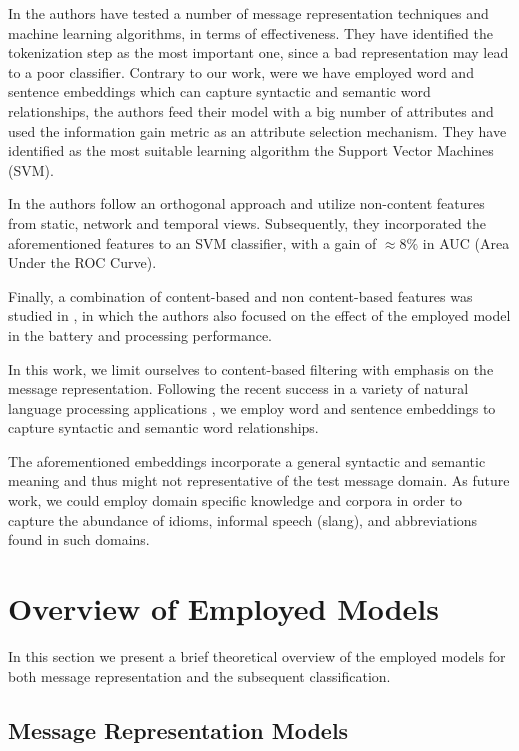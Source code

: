 \documentclass[letterpaper]{article}
\begin{document}
In \cite{gomez2006content} the authors have tested a number of message representation techniques and machine learning algorithms, in terms of effectiveness. They have identified the tokenization step as the most important one, since a bad representation may lead to a poor classifier. Contrary to our work, were we have employed word and sentence embeddings which can capture syntactic and semantic word relationships, the authors feed their model with a big number of attributes and used the information gain metric \cite{yang1999evaluation} as an attribute selection mechanism. They have identified as the most suitable learning algorithm the Support Vector Machines (SVM).

In \cite{6133257} the authors follow an orthogonal approach and utilize non-content features from static, network and temporal views. Subsequently, they incorporated the aforementioned features to an SVM classifier, with a gain of $\approx 8\%$ in AUC (Area Under the ROC Curve).

Finally, a combination of content-based and non content-based features was studied in \cite{sulaiman2016new}, in which the authors also focused on the effect of the employed model in the battery and processing performance.

In this work, we limit ourselves to content-based filtering with emphasis on the message representation. Following the recent success in a variety of natural language processing applications \cite{mikolov2013distributed} \cite{bojanowski2016enriching} \cite{pagliardini2017unsupervised}, we employ word and sentence embeddings to capture syntactic and semantic word relationships.

The aforementioned embeddings incorporate a general syntactic and semantic meaning and thus might not representative of the test message domain. As future work, we could employ domain specific knowledge and corpora in order to capture the abundance of idioms, informal speech (slang), and abbreviations found in such domains.

\section{Overview of Employed Models} \label{Overview}

In this section we present a brief theoretical overview of the employed models for both message representation and the subsequent classification.

\subsection{Message Representation Models}  \label{Representation}
\end{document}
